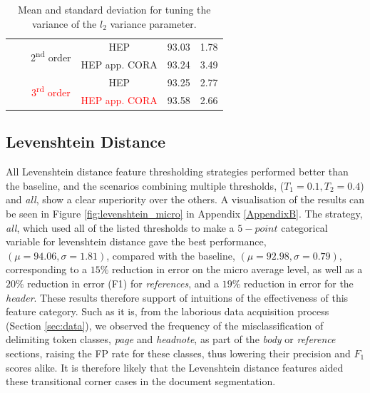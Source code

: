 \begin{table}[h]
\begin{center}
\begin{tabular}{|c|c|c|c|c|c|}
& & \multirow{2}{*}{2\textsuperscript{nd} order} & HEP & 93.03 & 1.78\\\cline{4-6}
& & & HEP app. CORA & 93.24 & 3.49\\\cline{3-6}
& & \multirow{2}{*}{\textcolor{red}{3\textsuperscript{rd} order}} & HEP & 93.25 & 2.77\\\cline{4-6}
& & & \textcolor{red}{HEP app. CORA} & 93.58 & 2.66\\
\hline
\end{tabular}
\caption[Mean and standard deviation for tuning the variance of the $l_2$ variance parameter.]{Mean and standard deviation for tuning the variance of the $l_2$ variance parameter.}
\label{table:dictionaryresults}
\end{center}
\end{table}

\subsection{Levenshtein Distance}

All Levenshtein distance feature thresholding strategies performed better than the baseline, and the scenarios combining multiple thresholds, ($T_1 = 0.1, T_2 = 0.4$) and \emph{all}, show a clear superiority over the others. A visualisation of the results can be seen in Figure \ref{fig:levenshtein_micro} in Appendix \ref{AppendixB}. The strategy, \emph{all}, which used all of the listed thresholds to make a $5-point$ categorical variable for levenshtein distance gave the best performance, $(\mu = 94.06, \sigma = 1.81)$, compared with the baseline, $(\mu = 92.98, \sigma = 0.79)$, corresponding to a $15\%$ reduction in error on the micro average level, as well as a $20\%$ reduction in error (F1) for \emph{references}, and a $19\%$ reduction in error for the \emph{header}. These results therefore support of intuitions of the effectiveness of this feature category. Such as it is, from the laborious data acquisition process (Section \ref{sec:data}), we observed the frequency of the misclassification of delimiting token classes, \emph{page} and \emph{headnote}, as part of the \emph{body} or \emph{reference} sections, raising the FP rate for these classes, thus lowering their precision and $F_1$ scores alike. It is therefore likely that the Levenshtein distance features aided these transitional corner cases in the document segmentation.

